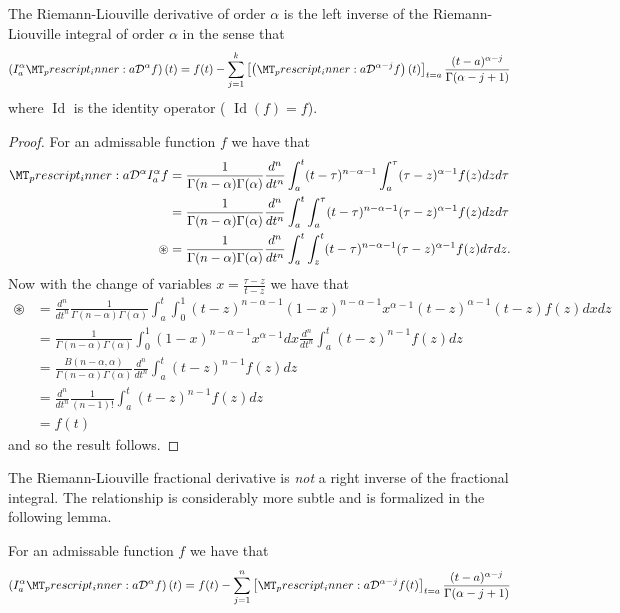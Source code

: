 \begin{lemma}
    The Riemann-Liouville derivative of order $ \alpha $ is the left inverse of the Riemann-Liouville integral of order $ \alpha $ in the sense
    that
    \begin{align}
        \left(I_a^\alpha \prescript{}{a}{\mathcal{D}}^\alpha f\right)(t) = f(t) - \sum_{j=1}^{k}\left[ \left(\prescript{}{a}{\mathcal{D}}^{\alpha - j}f \right)(t) \right]_{t=a} \frac{(t-a)^{\alpha - j}}{\Gamma(\alpha - j + 1)}
    \end{align}
    where $ \operatorname{Id} $ is the identity operator ( $\operatorname{Id}(f) = f $).
\end{lemma}
\begin{proof}
For an admissable function $ f $ we have that
\begin{align}
    \prescript{}{a}{\mathcal{D}}^\alpha I_{a}^\alpha f &= \frac{1}{\Gamma(n-\alpha)\Gamma(\alpha)} \frac{d^n}{dt^n} \int_a^t (t-\tau)^{n-\alpha-1}\int_a^\tau (\tau - z)^{\alpha-1} f(z) dz d\tau \\
    &= \frac{1}{\Gamma(n-\alpha)\Gamma(\alpha)} \frac{d^n}{dt^n} \int_a^t \int_a^\tau (t-\tau)^{n-\alpha-1}(\tau - z)^{\alpha - 1}f(z)dzd\tau \\
    \circledast &= \frac{1}{\Gamma(n-\alpha)\Gamma(\alpha)} \frac{d^n}{dt^n} \int_a^t \int_z^t (t-\tau)^{n-\alpha-1}(\tau - z)^{\alpha - 1} f(z)d\tau dz.
\end{align}
Now with the change of variables $ x = \frac{\tau - z}{t - z} $ we have that
\begin{align}
    \circledast &= \frac{d^n}{dt^n}\frac{1}{\Gamma(n-\alpha)\Gamma(\alpha)}\int_a^t \int_0^1 (t-z)^{n-\alpha-1}(1-x)^{n-\alpha-1} x^{\alpha-1}(t-z)^{\alpha-1}(t-z)f(z)dxdz \\
    &= \frac{1}{\Gamma(n-\alpha)\Gamma(\alpha)} \int_0^1 (1-x)^{n-\alpha-1}x^{\alpha-1} dx \frac{d^n}{dt^n}\int_a^t (t-z)^{n-1}f(z)dz \\
    &= \frac{B(n-\alpha, \alpha)}{\Gamma(n-\alpha)\Gamma(\alpha)} \frac{d^n}{dt^n} \int_a^t (t-z)^{n-1}f(z)dz \\
    &= \frac{d^n}{dt^n} \frac{1}{(n-1)!} \int_{a}^t(t-z)^{n-1}f(z) dz \\
    &= f(t)
\end{align}
and so the result follows.
\end{proof}
The Riemann-Liouville fractional derivative is \emph{not} a right inverse of the fractional integral. The relationship is considerably more subtle
and is formalized in the following lemma.
\begin{lemma}
    For an admissable function $ f $ we have that
    \begin{align}
        \left(I_a^\alpha \prescript{}{a}{\mathcal{D}}^\alpha f\right)(t) = f(t) - \sum_{j=1}^{n} \left[ \prescript{}{a}{\mathcal{D}}^{\alpha - j}f(t)\right]_{t=a} \frac{(t-a)^{\alpha - j}}{\Gamma(\alpha - j + 1)}
    \end{align}
\end{lemma}
